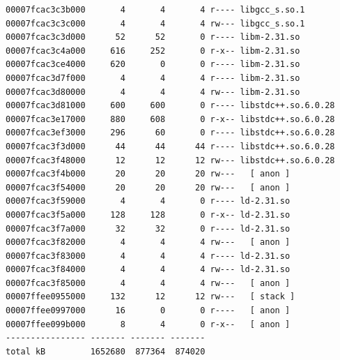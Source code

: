 \documentclass[11pt, a4paper]{article}
\begin{document}
\begin{Verbatim}[fontsize=\small]
00007fcac3c3b000       4       4       4 r---- libgcc_s.so.1
00007fcac3c3c000       4       4       4 rw--- libgcc_s.so.1
00007fcac3c3d000      52      52       0 r---- libm-2.31.so
00007fcac3c4a000     616     252       0 r-x-- libm-2.31.so
00007fcac3ce4000     620       0       0 r---- libm-2.31.so
00007fcac3d7f000       4       4       4 r---- libm-2.31.so
00007fcac3d80000       4       4       4 rw--- libm-2.31.so
00007fcac3d81000     600     600       0 r---- libstdc++.so.6.0.28
00007fcac3e17000     880     608       0 r-x-- libstdc++.so.6.0.28
00007fcac3ef3000     296      60       0 r---- libstdc++.so.6.0.28
00007fcac3f3d000      44      44      44 r---- libstdc++.so.6.0.28
00007fcac3f48000      12      12      12 rw--- libstdc++.so.6.0.28
00007fcac3f4b000      20      20      20 rw---   [ anon ]
00007fcac3f54000      20      20      20 rw---   [ anon ]
00007fcac3f59000       4       4       0 r---- ld-2.31.so
00007fcac3f5a000     128     128       0 r-x-- ld-2.31.so
00007fcac3f7a000      32      32       0 r---- ld-2.31.so
00007fcac3f82000       4       4       4 rw---   [ anon ]
00007fcac3f83000       4       4       4 r---- ld-2.31.so
00007fcac3f84000       4       4       4 rw--- ld-2.31.so
00007fcac3f85000       4       4       4 rw---   [ anon ]
00007ffee0955000     132      12      12 rw---   [ stack ]
00007ffee0997000      16       0       0 r----   [ anon ]
00007ffee099b000       8       4       0 r-x--   [ anon ]
---------------- ------- ------- -------
total kB         1652680  877364  874020
\end{Verbatim}
\end{document}
